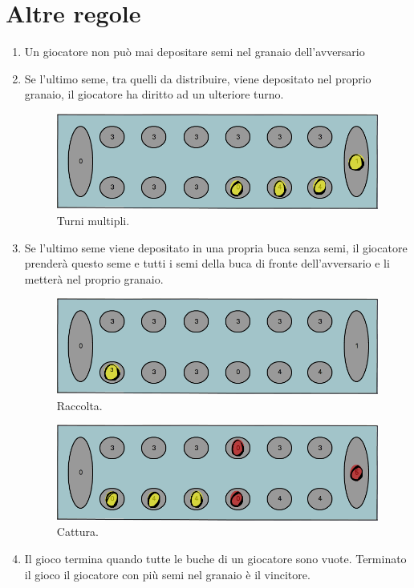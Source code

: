 \documentclass[paper=a4, fontsize=11pt]{scrartcl}	%
\numberwithin{equation}{section}															%
\numberwithin{figure}{section}																%
\numberwithin{table}{section}																%
\begin{document}
\section{Altre regole}
\begin{enumerate}
	\item Un giocatore non pu\`o mai depositare semi nel granaio dell'avversario
	\item Se l'ultimo seme, tra quelli da distribuire, viene depositato nel proprio granaio, il giocatore ha diritto ad un ulteriore turno.

\begin{figure}[h]
\centering
        \includegraphics[totalheight=3cm]{Bantumi_4.png}
    \caption{Turni multipli.}
    \label{fig:verticalcell}
\end{figure}
	\item Se l'ultimo seme viene depositato in una propria buca senza semi, il giocatore prender\`a questo seme e tutti i semi della buca di fronte dell'avversario e li metter\`a nel proprio granaio.

\begin{figure}[h]
\centering
        \includegraphics[totalheight=3cm]{Bantumi_2.png}
    \caption{Raccolta.}
    \label{fig:verticalcell}
\end{figure}
\begin{figure}[h]
\centering
        \includegraphics[totalheight=3cm]{Bantumi2.png}
    \caption{Cattura.}
    \label{fig:verticalcell}
\end{figure}

	\item Il gioco termina quando tutte le buche di un giocatore sono vuote. Terminato il gioco il giocatore con pi\`u semi nel granaio \`e il vincitore.
\end{enumerate}
\end{document}
